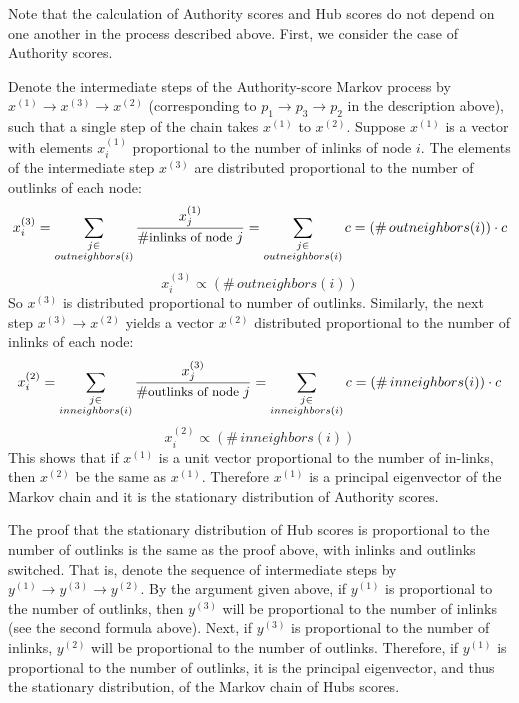 \documentclass[11pt,letterpaper]{article}
\begin{document}
Note that the calculation of Authority scores and Hub scores do not depend on one another in the process described above. First, we consider the case of Authority scores.

Denote the intermediate steps of the Authority-score Markov process by $x^{(1)} \to x^{(3)} \to x^{(2)}$ (corresponding to $p_1 \to p_3 \to p_2$ in the description above), such that a single step of the chain takes $x^{(1)}$ to $x^{(2)}$. Suppose $x^{(1)}$ is a vector with elements $x_i^{(1)}$ proportional to the number of inlinks of node $i$. The elements of the intermediate step $x^{(3)}$ are distributed proportional to the number of outlinks of each node:
\[ x_i^{(3)} = \sum_{\substack{j \in \\ outneighbors(i)}} \frac{x_j^{(1)}}{ \# \text{\small inlinks of node } j } = \sum_{\substack{j \in \\ outneighbors(i)}} c = (\#\, outneighbors(i)) \cdot c \]
\vspace{2mm}
\[ x_i^{(3)} \propto (\#\, outneighbors(i)) \]
So $x^{(3)}$ is distributed proportional to number of outlinks. Similarly, the next step $x^{(3)} \to x^{(2)}$ yields a vector $x^{(2)}$ distributed proportional to the number of inlinks of each node:
\[ x_i^{(2)} = \sum_{\substack{j \in \\ inneighbors(i)}} \frac{x_j^{(3)}}{ \# \text{\small outlinks of node } j } = \sum_{\substack{j \in \\ inneighbors(i)}} c = (\#\, inneighbors(i)) \cdot c \]
\vspace{2mm}
\[ x_i^{(2)} \propto (\#\, inneighbors(i)) \]
This shows that if $x^{(1)}$ is a unit vector proportional to the number of in-links, then $x^{(2)}$ be the same as $x^{(1)}$. Therefore $x^{(1)}$ is a principal eigenvector of the Markov chain and it is the stationary distribution of Authority scores.

The proof that the stationary distribution of Hub scores is proportional to the number of outlinks is the same as the proof above, with inlinks and outlinks switched. That is, denote the sequence of intermediate steps by $y^{(1)} \to y^{(3)} \to y^{(2)}$. By the argument given above, if $y^{(1)}$ is proportional to the number of outlinks, then $y^{(3)}$ will be proportional to the number of inlinks (see the second formula above). Next, if $y^{(3)}$ is proportional to the number of inlinks, $y^{(2)}$ will be proportional to the number of outlinks. Therefore, if $y^{(1)}$ is proportional to the number of outlinks, it is the principal eigenvector, and thus the stationary distribution, of the Markov chain of Hubs scores.
\end{document}
